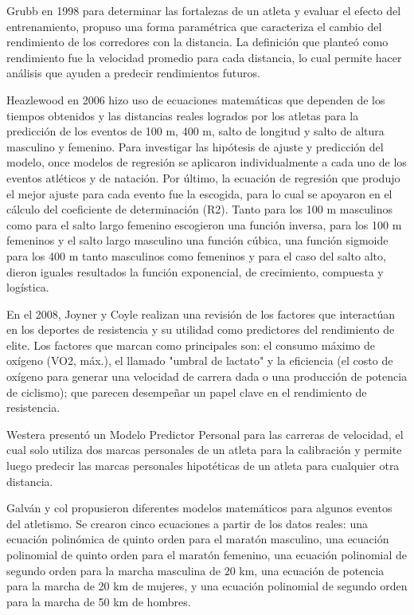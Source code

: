 Grubb en 1998 \cite{grubb1998models} para determinar las fortalezas de un atleta y evaluar el efecto del entrenamiento, propuso una forma paramétrica que caracteriza el cambio del rendimiento de los corredores con la distancia. La definición que planteó como rendimiento fue la velocidad promedio para cada distancia, lo cual permite hacer análisis que ayuden a predecir rendimientos futuros.

Heazlewood en 2006 \cite{heazlewood2006prediction} hizo uso de ecuaciones matemáticas que dependen de los tiempos obtenidos y las distancias reales logrados por los atletas para la predicción de los eventos de 100 m, 400 m, salto de longitud y salto de altura masculino y femenino. Para investigar las hipótesis de ajuste y predicción del modelo, once modelos de regresión se aplicaron individualmente a cada uno de los eventos atléticos y de natación. Por último, la ecuación de regresión que produjo el mejor ajuste para cada evento fue la escogida, para lo cual se apoyaron en el cálculo del coeficiente de determinación (R2). Tanto para los 100 m masculinos como para el salto largo femenino escogieron una función inversa, para los 100 m femeninos y el salto largo masculino una función cúbica, una función sigmoide para los 400 m tanto masculinos como femeninos y para el caso del salto alto, dieron iguales resultados la función exponencial, de crecimiento, compuesta y logística.  

En el 2008, Joyner y Coyle \cite{joyner2008endurance} realizan una revisión de los factores que interactúan en los deportes de resistencia y su utilidad como predictores del rendimiento de elite. Los factores que marcan como principales son: el consumo máximo de oxígeno (VO2, máx.), el llamado "umbral de lactato" y la eficiencia (el costo de oxígeno para generar una velocidad de carrera dada o una producción de potencia de ciclismo); que parecen desempeñar un papel clave en el rendimiento de resistencia.

Westera \cite{westera2011phenomenology} presentó un Modelo Predictor Personal para las carreras de velocidad, el cual solo utiliza dos marcas personales de un atleta para la calibración y permite luego predecir las marcas personales hipotéticas de un atleta para cualquier otra distancia.

Galván y col \cite{galvanmathematical} propusieron diferentes modelos matemáticos para algunos eventos del atletismo. Se crearon cinco ecuaciones a partir de los datos reales: una ecuación polinómica de quinto orden para el maratón masculino, una ecuación polinomial de quinto orden para el maratón femenino, una ecuación polinomial de segundo orden para la marcha masculina de 20 km, una ecuación de potencia para la marcha de 20 km de mujeres, y una ecuación polinomial de segundo orden para la marcha de 50 km de hombres.

